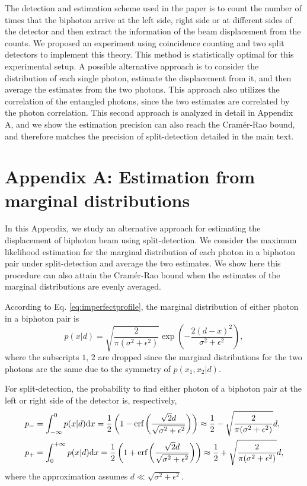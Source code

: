 The detection and estimation scheme used in the paper is to count the number of times that the biphoton arrive at the left side, right side or at different sides of the detector and then extract the information of the beam displacement from the counts. We proposed an experiment using coincidence counting and two split detectors to implement this theory. This method is statistically optimal for this experimental setup.  A possible alternative approach is to consider the distribution of each single photon, estimate the displacement from it, and then average the estimates from the two photons. This approach also utilizes the correlation of the entangled photons, since the two estimates are correlated by the photon correlation.  This second approach is analyzed in detail in Appendix A, and we show the estimation precision can also reach the Cram\'er-Rao bound, and therefore matches the precision of split-detection detailed in the main text.  


\section*{Appendix A: Estimation from marginal distributions}

In this Appendix, we study an alternative approach for estimating the  displacement of biphoton beam using split-detection. We consider the maximum likelihood estimation for the marginal distribution of each photon in a biphoton pair under split-detection and average the two estimates. We show here this procedure can also attain the Cram\'er-Rao bound when the estimates of the marginal distributions are evenly averaged.

According to Eq. \eqref{eq:imperfectprofile}, the marginal distribution of either photon in a biphoton pair is
\begin{equation}
p(x|d)=\sqrt{\frac{2}{\pi(\sigma^{2}+\epsilon^{2})}}\exp\left(-\frac{2(d-x)^{2}}{\sigma^{2}+\epsilon^{2}}\right),\label{eq:marginal distribution}
\end{equation}
where the subscripts $1,\,2$ are dropped since the marginal distributions
for the two photons are the same due to the symmetry of $p(x_{1},x_{2}|d)$.

For split-detection, the probability to find either photon of a biphoton pair at the
left or right side of the detector is, respectively,
\begin{equation}
\begin{aligned}p_{-} & =\int_{-\infty}^{0}p(x|d){\rm d} x=\frac{1}{2}\left(1-\text{erf}\left(\frac{\sqrt{2}d}{\sqrt{\sigma^{2}+\epsilon^{2}}}\right)\right) \approx\frac{1}{2}-\sqrt{\frac{2}{\pi(\sigma^{2}+\epsilon^{2})}}d,\\
p_{+} & =\int_{0}^{+\infty}p(x|d){\rm d} x=\frac{1}{2}\left(1+\text{erf}\left(\frac{\sqrt{2}d}{\sqrt{\sigma^{2}+\epsilon^{2}}}\right)\right)\approx\frac{1}{2}+\sqrt{\frac{2}{\pi(\sigma^{2}+\epsilon^{2})}}d,
\end{aligned}
\label{eq:2}
\end{equation}
where the approximation assumes $d\ll\sqrt{\sigma^{2}+\epsilon^{2}}$.

